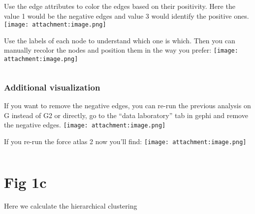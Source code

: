 \documentclass[11pt]{article}
\makeatletter
\newcommand{\boxspacing}{\kern\kvtcb@left@rule\kern\kvtcb@boxsep}
\newcommand{\prompt}[4]{
        {\ttfamily\llap{{\color{#2}[#3]:\hspace{3pt}#4}}\vspace{-\baselineskip}}
    }
\makeatother
\begin{document}
    Use the edge attributes to color the edges based on their positivity.
Here the value 1 would be the negative edges and value 3 would identify
the positive ones. \texttt{[image: attachment:image.png]}

    Use the labels of each node to understand which one is which. Then you
can manually recolor the nodes and position them in the way you prefer:
\texttt{[image: attachment:image.png]}

    \begin{tcolorbox}[breakable, size=fbox, boxrule=1pt, pad at break*=1mm,colback=cellbackground, colframe=cellborder]
\prompt{In}{incolor}{ }{\boxspacing}
\begin{Verbatim}[commandchars=\\\{\}]

\end{Verbatim}
\end{tcolorbox}

    \hypertarget{additional-visualization}{%
\subsubsection{Additional
visualization}\label{additional-visualization}}

    If you want to remove the negative edges, you can re-run the previous
analysis on G instead of G2 or directly, go to the ``data laboratory''
tab in gephi and remove the negative edges.
\texttt{[image: attachment:image.png]}

    If you re-run the force atlas 2 now you'll find:
\texttt{[image: attachment:image.png]}

    \begin{tcolorbox}[breakable, size=fbox, boxrule=1pt, pad at break*=1mm,colback=cellbackground, colframe=cellborder]
\prompt{In}{incolor}{ }{\boxspacing}
\begin{Verbatim}[commandchars=\\\{\}]

\end{Verbatim}
\end{tcolorbox}

    \hypertarget{fig-1c}{%
\section{Fig 1c}\label{fig-1c}}

    Here we calculate the hierarchical clustering
\end{document}
